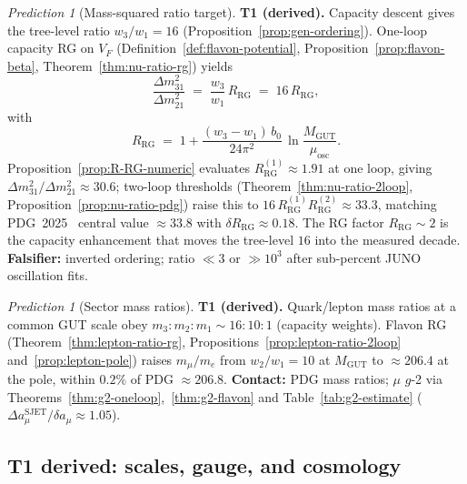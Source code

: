 \documentclass[11pt]{article}
\theoremstyle{plain}
\theoremstyle{definition}
\theoremstyle{remark}
\newtheorem{prediction}[theorem]{Prediction}
\numberwithin{equation}{section}
\begin{document}
\begin{prediction}[Mass-squared ratio target]\label{pred:nu-ratio}
\textbf{T1 (derived).} Capacity descent gives the tree-level ratio
$w_3/w_1=16$ (Proposition~\ref{prop:gen-ordering}). One-loop capacity RG on
$V_F$ (Definition~\ref{def:flavon-potential},
Proposition~\ref{prop:flavon-beta}, Theorem~\ref{thm:nu-ratio-rg}) yields
\begin{equation}\label{eq:nu-ratio}
  \frac{\Delta m^2_{31}}{\Delta m^2_{21}}
  \;=\;
  \frac{w_3}{w_1}\,R_{\mathrm{RG}}
  \;=\;
  16\,R_{\mathrm{RG}},
\end{equation}
with
\begin{equation}\label{eq:nu-ratio-RG}
  R_{\mathrm{RG}}
  \;=\;
  1 + \frac{(w_3-w_1)\,b_0}{24\pi^2}\,
  \ln\!\frac{M_{\mathrm{GUT}}}{\mu_{\mathrm{osc}}}.
\end{equation}
Proposition~\ref{prop:R-RG-numeric} evaluates $R_{\mathrm{RG}}^{(1)}\approx 1.91$
at one loop, giving $\Delta m^2_{31}/\Delta m^2_{21}\approx 30.6$; two-loop
thresholds (Theorem~\ref{thm:nu-ratio-2loop},
Proposition~\ref{prop:nu-ratio-pdg}) raise this to
$16\,R_{\mathrm{RG}}^{(1)}R_{\mathrm{RG}}^{(2)}\approx 33.3$, matching
PDG~2025~\cite{PDG2025} central value $\approx 33.8$ with
$\delta R_{\mathrm{RG}}\approx 0.18$. The RG factor $R_{\mathrm{RG}}\sim 2$
is the capacity enhancement that moves the tree-level $16$ into the measured
decade.
\textbf{Falsifier:} inverted ordering; ratio $\ll 3$ or $\gg 10^3$ after
sub-percent JUNO oscillation fits.
\end{prediction}

\begin{prediction}[Sector mass ratios]\label{pred:sector-ratios}
\textbf{T1 (derived).} Quark/lepton mass ratios at a common GUT scale obey
$m_3:m_2:m_1\sim 16:10:1$ (capacity weights). Flavon RG
(Theorem~\ref{thm:lepton-ratio-rg}, Propositions~\ref{prop:lepton-ratio-2loop}
and~\ref{prop:lepton-pole}) raises $m_\mu/m_e$ from $w_2/w_1=10$ at
$M_{\mathrm{GUT}}$ to $\approx206.4$ at the pole, within $0.2\%$ of PDG
$\approx206.8$.
\textbf{Contact:} PDG mass ratios; $\mu$ $g$-2 via
Theorems~\ref{thm:g2-oneloop},~\ref{thm:g2-flavon} and
Table~\ref{tab:g2-estimate} ($\Delta a_\mu^{\mathrm{SJET}}/\delta a_\mu\approx1.05$).
\end{prediction}

\subsection{T1 derived: scales, gauge, and cosmology}
\label{sec:predictions:T1-derived-scales}
\end{document}
